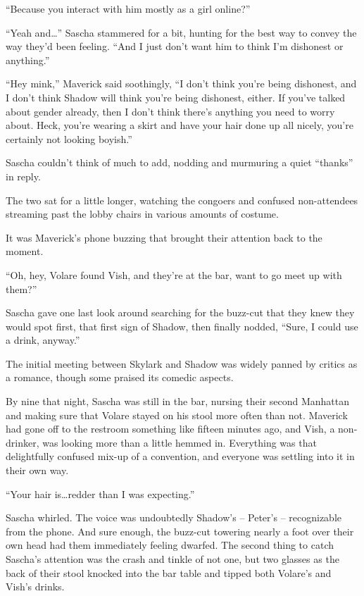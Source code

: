 ``Because you interact with him mostly as a girl online?''

``Yeah and\ldots{}'' Sascha stammered for a bit, hunting for the best way to convey the way they'd been feeling. ``And I just don't want him to think I'm dishonest or anything.''

``Hey mink,'' Maverick said soothingly, ``I don't think you're being dishonest, and I don't think Shadow will think you're being dishonest, either. If you've talked about gender already, then I don't think there's anything you need to worry about. Heck, you're wearing a skirt and have your hair done up all nicely, you're certainly not looking boyish.''

Sascha couldn't think of much to add, nodding and murmuring a quiet ``thanks'' in reply.

The two sat for a little longer, watching the congoers and confused non-attendees streaming past the lobby chairs in various amounts of costume.

It was Maverick's phone buzzing that brought their attention back to the moment.

``Oh, hey, Volare found Vish, and they're at the bar, want to go meet up with them?''

Sascha gave one last look around searching for the buzz-cut that they knew they would spot first, that first sign of Shadow, then finally nodded, ``Sure, I could use a drink, anyway.''

\secdiv

The initial meeting between Skylark and Shadow was widely panned by critics as a romance, though some praised its comedic aspects.

By nine that night, Sascha was still in the bar, nursing their second Manhattan and making sure that Volare stayed on his stool more often than not. Maverick had gone off to the restroom something like fifteen minutes ago, and Vish, a non-drinker, was looking more than a little hemmed in. Everything was that delightfully confused mix-up of a convention, and everyone was settling into it in their own way.

``Your hair is\ldots{}redder than I was expecting.''

Sascha whirled. The voice was undoubtedly Shadow's -- Peter's -- recognizable from the phone.  And sure enough, the buzz-cut towering nearly a foot over their own head had them immediately feeling dwarfed. The second thing to catch Sascha's attention was the crash and tinkle of not one, but two glasses as the back of their stool knocked into the bar table and tipped both Volare's and Vish's drinks.

